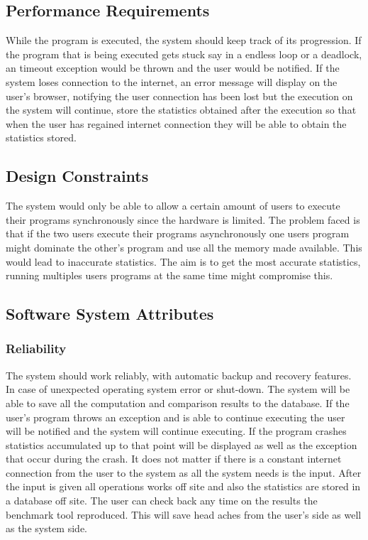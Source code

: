 \documentclass[a4paper,12pt]{article}
\begin{document}
\subsection{Performance Requirements}
While the program is executed, the system should keep track of its progression. If the program that is being executed gets stuck say in a endless loop or a deadlock, an timeout exception would be thrown and the user would be notified.
If the system loses connection to the internet, an error message will display on the user's browser, notifying the user connection has been lost but the execution on the system will continue, store the statistics obtained after the execution so that when the user has regained internet connection they will be able to obtain the statistics stored. 
\subsection{Design Constraints}
The system would only be able to allow a certain amount of users to execute their programs synchronously since the hardware is limited. The problem faced is that if the two users execute their programs asynchronously one users program might dominate the other's program and use all the memory made available. This would lead to inaccurate statistics.  The aim is to get the most accurate statistics, running multiples users programs at the same time might compromise this. 
\subsection{Software System Attributes}
\subsubsection{Reliability}
The system should work reliably, with automatic backup and recovery features. In case of unexpected operating system error or shut-down. The system will be able to save all the computation and comparison results to the database. If the user's program throws an exception and is able to continue executing the user will be notified and the system will continue executing. If the program crashes statistics accumulated up to that point will be displayed as well as the exception that occur during the crash. It does not matter if there is a constant internet connection from the user to the system as all the system needs is the input. After the input is given all operations works off site and also the statistics are stored in a database off site. The user can check back any time on the results the benchmark tool reproduced. This will save head aches from the user's side as well as the system side.
\end{document}
